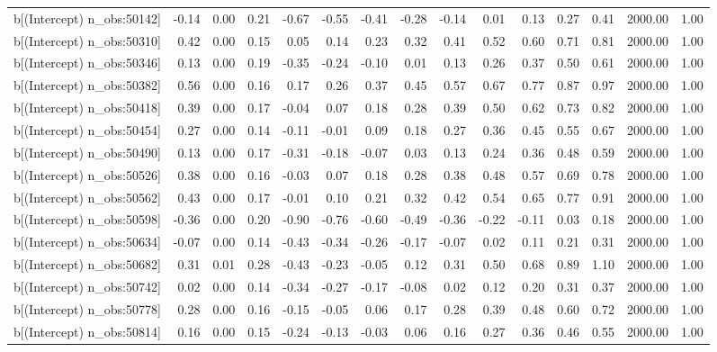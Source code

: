 \begin{table}[ht]
\begin{tabular}{rrrrrrrrrrrrrrr}
  b[(Intercept) n\_obs:50142] & -0.14 & 0.00 & 0.21 & -0.67 & -0.55 & -0.41 & -0.28 & -0.14 & 0.01 & 0.13 & 0.27 & 0.41 & 2000.00 & 1.00 \\ 
  b[(Intercept) n\_obs:50310] & 0.42 & 0.00 & 0.15 & 0.05 & 0.14 & 0.23 & 0.32 & 0.41 & 0.52 & 0.60 & 0.71 & 0.81 & 2000.00 & 1.00 \\ 
  b[(Intercept) n\_obs:50346] & 0.13 & 0.00 & 0.19 & -0.35 & -0.24 & -0.10 & 0.01 & 0.13 & 0.26 & 0.37 & 0.50 & 0.61 & 2000.00 & 1.00 \\ 
  b[(Intercept) n\_obs:50382] & 0.56 & 0.00 & 0.16 & 0.17 & 0.26 & 0.37 & 0.45 & 0.57 & 0.67 & 0.77 & 0.87 & 0.97 & 2000.00 & 1.00 \\ 
  b[(Intercept) n\_obs:50418] & 0.39 & 0.00 & 0.17 & -0.04 & 0.07 & 0.18 & 0.28 & 0.39 & 0.50 & 0.62 & 0.73 & 0.82 & 2000.00 & 1.00 \\ 
  b[(Intercept) n\_obs:50454] & 0.27 & 0.00 & 0.14 & -0.11 & -0.01 & 0.09 & 0.18 & 0.27 & 0.36 & 0.45 & 0.55 & 0.67 & 2000.00 & 1.00 \\ 
  b[(Intercept) n\_obs:50490] & 0.13 & 0.00 & 0.17 & -0.31 & -0.18 & -0.07 & 0.03 & 0.13 & 0.24 & 0.36 & 0.48 & 0.59 & 2000.00 & 1.00 \\ 
  b[(Intercept) n\_obs:50526] & 0.38 & 0.00 & 0.16 & -0.03 & 0.07 & 0.18 & 0.28 & 0.38 & 0.48 & 0.57 & 0.69 & 0.78 & 2000.00 & 1.00 \\ 
  b[(Intercept) n\_obs:50562] & 0.43 & 0.00 & 0.17 & -0.01 & 0.10 & 0.21 & 0.32 & 0.42 & 0.54 & 0.65 & 0.77 & 0.91 & 2000.00 & 1.00 \\ 
  b[(Intercept) n\_obs:50598] & -0.36 & 0.00 & 0.20 & -0.90 & -0.76 & -0.60 & -0.49 & -0.36 & -0.22 & -0.11 & 0.03 & 0.18 & 2000.00 & 1.00 \\ 
  b[(Intercept) n\_obs:50634] & -0.07 & 0.00 & 0.14 & -0.43 & -0.34 & -0.26 & -0.17 & -0.07 & 0.02 & 0.11 & 0.21 & 0.31 & 2000.00 & 1.00 \\ 
  b[(Intercept) n\_obs:50682] & 0.31 & 0.01 & 0.28 & -0.43 & -0.23 & -0.05 & 0.12 & 0.31 & 0.50 & 0.68 & 0.89 & 1.10 & 2000.00 & 1.00 \\ 
  b[(Intercept) n\_obs:50742] & 0.02 & 0.00 & 0.14 & -0.34 & -0.27 & -0.17 & -0.08 & 0.02 & 0.12 & 0.20 & 0.31 & 0.37 & 2000.00 & 1.00 \\ 
  b[(Intercept) n\_obs:50778] & 0.28 & 0.00 & 0.16 & -0.15 & -0.05 & 0.06 & 0.17 & 0.28 & 0.39 & 0.48 & 0.60 & 0.72 & 2000.00 & 1.00 \\ 
  b[(Intercept) n\_obs:50814] & 0.16 & 0.00 & 0.15 & -0.24 & -0.13 & -0.03 & 0.06 & 0.16 & 0.27 & 0.36 & 0.46 & 0.55 & 2000.00 & 1.00 \\ 

\end{tabular}
\end{table}
